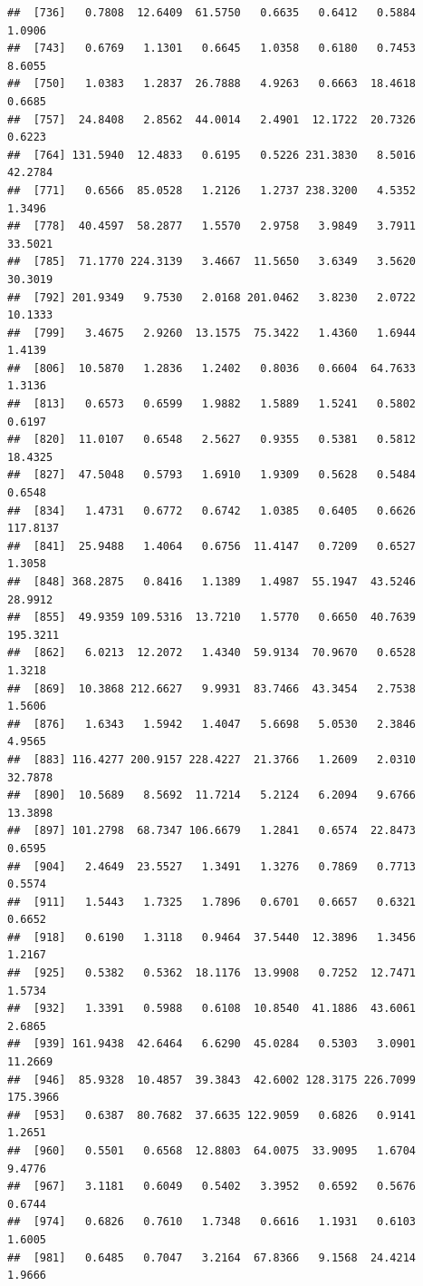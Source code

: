 \documentclass{article}\usepackage[]{graphicx}\usepackage[]{color}
\makeatletter
\newenvironment{kframe}{%
 \def\at@end@of@kframe{}%
 \ifinner\ifhmode%
  \def\at@end@of@kframe{\end{minipage}}%
  \begin{minipage}{\columnwidth}%
 \fi\fi%
 \def\FrameCommand##1{\hskip\@totalleftmargin \hskip-\fboxsep
 \colorbox{shadecolor}{##1}\hskip-\fboxsep
     \hskip-\linewidth \hskip-\@totalleftmargin \hskip\columnwidth}%
 \MakeFramed {\advance\hsize-\width
   \@totalleftmargin\z@ \linewidth\hsize
   \@setminipage}}%
 {\par\unskip\endMakeFramed%
 \at@end@of@kframe}
\newenvironment{knitrout}{}{} %
\makeatother
\begin{document}
\begin{knitrout}
\begin{kframe}
\begin{verbatim}
##  [736]   0.7808  12.6409  61.5750   0.6635   0.6412   0.5884   1.0906
##  [743]   0.6769   1.1301   0.6645   1.0358   0.6180   0.7453   8.6055
##  [750]   1.0383   1.2837  26.7888   4.9263   0.6663  18.4618   0.6685
##  [757]  24.8408   2.8562  44.0014   2.4901  12.1722  20.7326   0.6223
##  [764] 131.5940  12.4833   0.6195   0.5226 231.3830   8.5016  42.2784
##  [771]   0.6566  85.0528   1.2126   1.2737 238.3200   4.5352   1.3496
##  [778]  40.4597  58.2877   1.5570   2.9758   3.9849   3.7911  33.5021
##  [785]  71.1770 224.3139   3.4667  11.5650   3.6349   3.5620  30.3019
##  [792] 201.9349   9.7530   2.0168 201.0462   3.8230   2.0722  10.1333
##  [799]   3.4675   2.9260  13.1575  75.3422   1.4360   1.6944   1.4139
##  [806]  10.5870   1.2836   1.2402   0.8036   0.6604  64.7633   1.3136
##  [813]   0.6573   0.6599   1.9882   1.5889   1.5241   0.5802   0.6197
##  [820]  11.0107   0.6548   2.5627   0.9355   0.5381   0.5812  18.4325
##  [827]  47.5048   0.5793   1.6910   1.9309   0.5628   0.5484   0.6548
##  [834]   1.4731   0.6772   0.6742   1.0385   0.6405   0.6626 117.8137
##  [841]  25.9488   1.4064   0.6756  11.4147   0.7209   0.6527   1.3058
##  [848] 368.2875   0.8416   1.1389   1.4987  55.1947  43.5246  28.9912
##  [855]  49.9359 109.5316  13.7210   1.5770   0.6650  40.7639 195.3211
##  [862]   6.0213  12.2072   1.4340  59.9134  70.9670   0.6528   1.3218
##  [869]  10.3868 212.6627   9.9931  83.7466  43.3454   2.7538   1.5606
##  [876]   1.6343   1.5942   1.4047   5.6698   5.0530   2.3846   4.9565
##  [883] 116.4277 200.9157 228.4227  21.3766   1.2609   2.0310  32.7878
##  [890]  10.5689   8.5692  11.7214   5.2124   6.2094   9.6766  13.3898
##  [897] 101.2798  68.7347 106.6679   1.2841   0.6574  22.8473   0.6595
##  [904]   2.4649  23.5527   1.3491   1.3276   0.7869   0.7713   0.5574
##  [911]   1.5443   1.7325   1.7896   0.6701   0.6657   0.6321   0.6652
##  [918]   0.6190   1.3118   0.9464  37.5440  12.3896   1.3456   1.2167
##  [925]   0.5382   0.5362  18.1176  13.9908   0.7252  12.7471   1.5734
##  [932]   1.3391   0.5988   0.6108  10.8540  41.1886  43.6061   2.6865
##  [939] 161.9438  42.6464   6.6290  45.0284   0.5303   3.0901  11.2669
##  [946]  85.9328  10.4857  39.3843  42.6002 128.3175 226.7099 175.3966
##  [953]   0.6387  80.7682  37.6635 122.9059   0.6826   0.9141   1.2651
##  [960]   0.5501   0.6568  12.8803  64.0075  33.9095   1.6704   9.4776
##  [967]   3.1181   0.6049   0.5402   3.3952   0.6592   0.5676   0.6744
##  [974]   0.6826   0.7610   1.7348   0.6616   1.1931   0.6103   1.6005
##  [981]   0.6485   0.7047   3.2164  67.8366   9.1568  24.4214   1.9666

\end{verbatim}
\end{kframe}
\end{knitrout}
\end{document}
